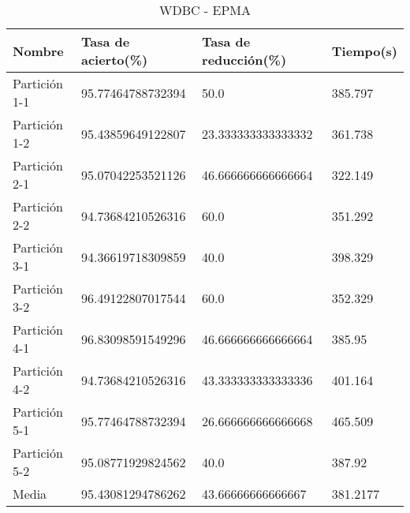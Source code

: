 \begin{table}[H]
	\centering
	\begin{tabular}{l|lll}
		Nombre        & Tasa de acierto(\%) & Tasa de reducción(\%) & Tiempo(s) \\ \hline
		Partición 1-1 & 95.77464788732394   & 50.0                  & 385.797   \\
		Partición 1-2 & 95.43859649122807   & 23.333333333333332    & 361.738   \\
		Partición 2-1 & 95.07042253521126   & 46.666666666666664    & 322.149   \\
		Partición 2-2 & 94.73684210526316   & 60.0                  & 351.292   \\
		Partición 3-1 & 94.36619718309859   & 40.0                  & 398.329   \\
		Partición 3-2 & 96.49122807017544   & 60.0                  & 352.329   \\
		Partición 4-1 & 96.83098591549296   & 46.666666666666664    & 385.95    \\
		Partición 4-2 & 94.73684210526316   & 43.333333333333336    & 401.164   \\
		Partición 5-1 & 95.77464788732394   & 26.666666666666668    & 465.509   \\
		Partición 5-2 & 95.08771929824562   & 40.0                  & 387.92    \\ \hline
		Media         & 95.43081294786262   & 43.66666666666667     & 381.2177
	\end{tabular}
	\caption{WDBC - EPMA}
	\label{WDBC-EPMA}
\end{table}